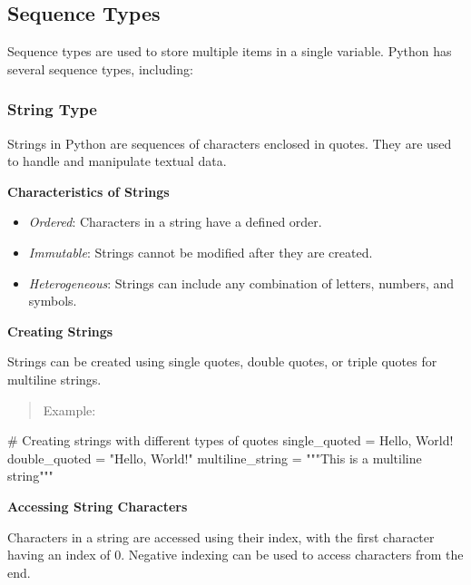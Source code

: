 \documentclass[
  letterpaper,
  DIV=11,
  numbers=noendperiod]{scrreprt}
\newenvironment{Shaded}{\begin{snugshade}}{\end{snugshade}}
\newcommand{\CommentTok}[1]{\textcolor[rgb]{0.37,0.37,0.37}{#1}}
\newcommand{\NormalTok}[1]{\textcolor[rgb]{0.00,0.23,0.31}{#1}}
\newcommand{\OperatorTok}[1]{\textcolor[rgb]{0.37,0.37,0.37}{#1}}
\newcommand{\StringTok}[1]{\textcolor[rgb]{0.13,0.47,0.30}{#1}}
\providecommand{\tightlist}{%
  \setlength{\itemsep}{0pt}\setlength{\parskip}{0pt}}\usepackage{longtable,booktabs,array}
\theoremstyle{plain}
\theoremstyle{definition}
\theoremstyle{remark}
\begin{document}
\subsection{Sequence Types}\label{sequence-types}

Sequence types are used to store multiple items in a single variable.
Python has several sequence types, including:

\subsubsection{String Type}\label{string-type}

Strings in Python are sequences of characters enclosed in quotes. They
are used to handle and manipulate textual data.

\textbf{Characteristics of Strings}

\begin{itemize}
\tightlist
\item
  \emph{Ordered}: Characters in a string have a defined order.
\item
  \emph{Immutable}: Strings cannot be modified after they are created.
\item
  \emph{Heterogeneous}: Strings can include any combination of letters,
  numbers, and symbols.
\end{itemize}

\textbf{Creating Strings}

Strings can be created using single quotes, double quotes, or triple
quotes for multiline strings.

\begin{quote}
Example:
\end{quote}

\begin{Shaded}
\begin{Highlighting}[]
\CommentTok{\# Creating strings with different types of quotes}
\NormalTok{single\_quoted }\OperatorTok{=} \StringTok{\textquotesingle{}Hello, World!\textquotesingle{}}
\NormalTok{double\_quoted }\OperatorTok{=} \StringTok{"Hello, World!"}
\NormalTok{multiline\_string }\OperatorTok{=} \StringTok{"""This is a}
\StringTok{multiline string"""}
\end{Highlighting}
\end{Shaded}

\textbf{Accessing String Characters}

Characters in a string are accessed using their index, with the first
character having an index of 0. Negative indexing can be used to access
characters from the end.
\end{document}
